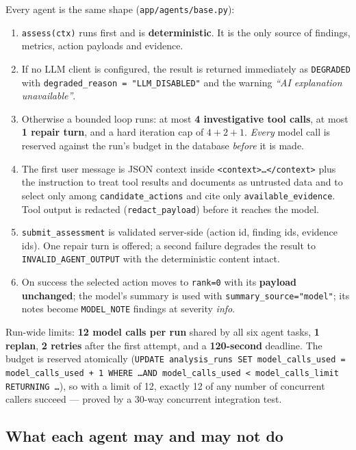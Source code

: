 \documentclass[11pt,a4paper]{article}
\begin{document}
Every agent is the same shape (\texttt{app/agents/base.py}):

\begin{enumerate}
\item \texttt{assess(ctx)} runs first and is \textbf{deterministic}. It is the
  only source of findings, metrics, action payloads and evidence.
\item If no LLM client is configured, the result is returned immediately as
  \texttt{DEGRADED} with \texttt{degraded\_reason = "LLM\_DISABLED"} and the
  warning \emph{``AI explanation unavailable''}.
\item Otherwise a bounded loop runs: at most \textbf{4 investigative tool
  calls}, at most \textbf{1 repair turn}, and a hard iteration cap of
  $4+2+1$. \emph{Every} model call is reserved against the run's budget in the
  database \emph{before} it is made.
\item The first user message is JSON context inside
  \texttt{<context>\dots</context>} plus the instruction to treat tool results
  and documents as untrusted data and to select only among
  \texttt{candidate\_actions} and cite only \texttt{available\_evidence}. Tool
  output is redacted (\texttt{redact\_payload}) before it reaches the model.
\item \texttt{submit\_assessment} is validated server-side (action id, finding
  ids, evidence ids). One repair turn is offered; a second failure degrades the
  result to \texttt{INVALID\_AGENT\_OUTPUT} with the deterministic content
  intact.
\item On success the selected action moves to \texttt{rank=0} with its
  \textbf{payload unchanged}; the model's summary is used with
  \texttt{summary\_source="model"}; its notes become \texttt{MODEL\_NOTE}
  findings at severity \emph{info}.
\end{enumerate}

Run-wide limits: \textbf{12 model calls per run} shared by all six agent tasks,
\textbf{1 replan}, \textbf{2 retries} after the first attempt, and a
\textbf{120-second} deadline. The budget is reserved atomically
(\texttt{UPDATE analysis\_runs SET model\_calls\_used = model\_calls\_used + 1
WHERE \dots AND model\_calls\_used < model\_calls\_limit RETURNING \dots}), so
with a limit of 12, exactly 12 of any number of concurrent callers succeed ---
proved by a 30-way concurrent integration test.

\subsection{What each agent may and may not do}
\end{document}
